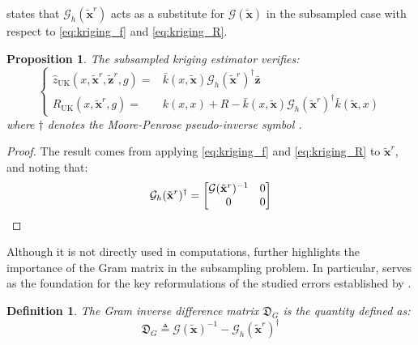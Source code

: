 \documentclass[preprint]{elsarticle}
\newtheorem{definition}{Definition}
\newtheorem{proposition}{Proposition}
\begin{document}
 states that $\mathcal{G}_h(\tilde{\mathbf{x}}^r)$ acts as a substitute for $\mathcal{G}(\tilde{\mathbf{x}})$ in the subsampled case with respect to \eqref{eq:kriging_f} and \eqref{eq:kriging_R}.

\begin{proposition}
    The subsampled kriging estimator verifies:
    \begin{equation*}
        \left\{\begin{aligned}
        \hat{z}_{\mathrm{UK}}(x,\tilde{\mathbf{x}}^r,\tilde{\mathbf{z}}^r,g)=&\bar{k}(x,\tilde{\mathbf{x}})\mathcal{G}_h(\tilde{\mathbf{x}}^r)^\dagger\bar{\mathbf{z}}\\
        R_{\mathrm{UK}}(x,\tilde{\mathbf{x}}^r,g)=&k(x,x)+R-\bar{k}(x,\tilde{\mathbf{x}})\mathcal{G}_h(\tilde{\mathbf{x}}^r)^\dagger\bar{k}(\tilde{\mathbf{x}},x)
        \end{aligned}\right.
    \end{equation*}
    where $\dagger$ denotes the Moore-Penrose pseudo-inverse symbol \cite{bib:matrix-analysis}.\label{th:subsampled_kriging}
\end{proposition}

\begin{proof}
    The result comes from applying \eqref{eq:kriging_f} and \eqref{eq:kriging_R} to $\tilde{\mathbf{x}}^r$, and noting that:
    \begin{equation*}
        \mathcal{G}_h(\tilde{\mathbf{x}}^r)^\dagger=\begin{bmatrix}\mathcal{G}(\tilde{\mathbf{x}}^r)^{-1}&0\\0&0\end{bmatrix}\vspace{-1.1\baselineskip}
    \end{equation*}
\end{proof}

Although it is not directly used in computations,  further highlights the importance of the Gram matrix in the subsampling problem. In particular,  serves as the foundation for the key reformulations of the studied errors established by .

\begin{definition}
    The Gram inverse difference matrix $\mathfrak{D}_G$ is the quantity defined as:
    \begin{equation*}
        \mathfrak{D}_G\triangleq\mathcal{G}(\tilde{\mathbf{x}})^{-1}-\mathcal{G}_h(\tilde{\mathbf{x}}^r)^\dagger
    \end{equation*}\label{def:Gram_inverse_difference}
    \vspace{-\baselineskip}
\end{definition}
\end{document}
